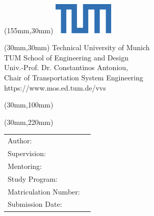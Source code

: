 
\begin{titlepage}
\begin{textblock*}{50mm}(155mm,30mm)
    \includegraphics[height=15mm]{DefaultTemplate/Logos/TUM1.png}
\end{textblock*}
\begin{textblock*}{90mm}(30mm,30mm)
    \footnotesize{
    Technical University of Munich\\
    TUM School of Engineering and Design\\
    Univ.-Prof. Dr. Constantinos Antoniou, \\
    Chair of Transportation System Engineering\\
    https://www.mos.ed.tum.de/vvs
    }
\end{textblock*}
\begin{textblock*}{150mm}(30mm,100mm)
  {\huge\bfseries\getTitle{}}
  \vspace{15mm}
   \\{\Large\getsubTitle{}} 
\end{textblock*}
\begin{textblock*}{150mm}(30mm,220mm)
    \begin{tabular}{l l}
Author:                     &\getAuthor{} \\
Supervision:                &\getSupervisor{} \\
Mentoring:                  &\getMentor{}\\
Study Program:              &\getCourseofStudy{} \\
Matriculation Number:       &\getAuthorMatrNr{}\\
Submission Date:            &\getSubmissionDate{} \\
    \end{tabular}
\end{textblock*}
\null
\end{titlepage}
